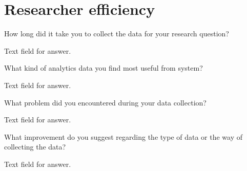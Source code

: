 \section{Researcher efficiency}

\begin{question}
	\item How long did it take you to collect the data for your research question?
\end{question}

Text field for answer.

\begin{question}
	\item What kind of analytics data you find most useful from system?
\end{question}

Text field for answer.

\begin{question}
	\item What problem did you encountered during your data collection?
\end{question}

Text field for answer.

\begin{question}
	\item What improvement do you suggest regarding the type of data or the way of collecting the data?
\end{question}

Text field for answer.

